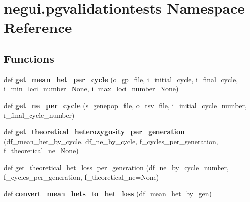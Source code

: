 \hypertarget{namespacenegui_1_1pgvalidationtests}{}\section{negui.\+pgvalidationtests Namespace Reference}
\label{namespacenegui_1_1pgvalidationtests}
\subsection*{Functions}
\begin{DoxyCompactItemize}
\item 
def {\bfseries get\+\_\+mean\+\_\+het\+\_\+per\+\_\+cycle} (o\+\_\+gp\+\_\+file, i\+\_\+initial\+\_\+cycle, i\+\_\+final\+\_\+cycle, i\+\_\+min\+\_\+loci\+\_\+number=None, i\+\_\+max\+\_\+loci\+\_\+number=None)\hypertarget{namespacenegui_1_1pgvalidationtests_abdedaca92f6f5d5805336dd4fd18e024}{}\label{namespacenegui_1_1pgvalidationtests_abdedaca92f6f5d5805336dd4fd18e024}

\item 
def {\bfseries get\+\_\+ne\+\_\+per\+\_\+cycle} (s\+\_\+genepop\+\_\+file, o\+\_\+tsv\+\_\+file, i\+\_\+initial\+\_\+cycle\+\_\+number, i\+\_\+final\+\_\+cycle\+\_\+number)\hypertarget{namespacenegui_1_1pgvalidationtests_afb63c4540c899abedfc31f3c900a4503}{}\label{namespacenegui_1_1pgvalidationtests_afb63c4540c899abedfc31f3c900a4503}

\item 
def {\bfseries get\+\_\+theoretical\+\_\+heterozygosity\+\_\+per\+\_\+generation} (df\+\_\+mean\+\_\+het\+\_\+by\+\_\+cycle, df\+\_\+ne\+\_\+by\+\_\+cycle, f\+\_\+cycles\+\_\+per\+\_\+generation, f\+\_\+theoretical\+\_\+ne=None)\hypertarget{namespacenegui_1_1pgvalidationtests_a4e442184f7a2ce77a351938557e4f42b}{}\label{namespacenegui_1_1pgvalidationtests_a4e442184f7a2ce77a351938557e4f42b}

\item 
def \hyperlink{namespacenegui_1_1pgvalidationtests_ab5c519679dcc75c116bcbd7883107cfb}{get\+\_\+theoretical\+\_\+het\+\_\+loss\+\_\+per\+\_\+generation} (df\+\_\+ne\+\_\+by\+\_\+cycle\+\_\+number, f\+\_\+cycles\+\_\+per\+\_\+generation, f\+\_\+theoretical\+\_\+ne=None)
\item 
def {\bfseries convert\+\_\+mean\+\_\+hets\+\_\+to\+\_\+het\+\_\+loss} (df\+\_\+mean\+\_\+het\+\_\+by\+\_\+gen)\hypertarget{namespacenegui_1_1pgvalidationtests_a5523f829bf2db243c0e01358eb13c694}{}\label{namespacenegui_1_1pgvalidationtests_a5523f829bf2db243c0e01358eb13c694}


\end{DoxyCompactItemize}
